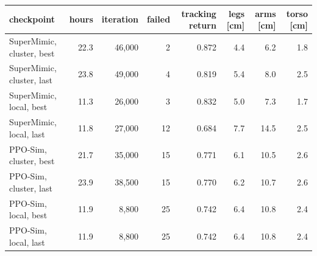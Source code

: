 \begin{tabular}{lrrrrrrr}\toprule
checkpoint & hours & iteration & failed & tracking return & legs [cm] & arms [cm] & torso [cm] \\\midrule
SuperMimic, cluster, best & 22.3 & 46,000 & 2 & 0.872 & 4.4 & 6.2 & 1.8 \\
SuperMimic, cluster, last & 23.8 & 49,000 & 4 & 0.819 & 5.4 & 8.0 & 2.5 \\
\midrule
SuperMimic, local, best & 11.3 & 26,000 & 3 & 0.832 & 5.0 & 7.3 & 1.7 \\
SuperMimic, local, last & 11.8 & 27,000 & 12 & 0.684 & 7.7 & 14.5 & 2.5 \\
\midrule
PPO-Sim, cluster, best & 21.7 & 35,000 & 15 & 0.771 & 6.1 & 10.5 & 2.6 \\
PPO-Sim, cluster, last & 23.9 & 38,500 & 15 & 0.770 & 6.2 & 10.7 & 2.6 \\
\midrule
PPO-Sim, local, best & 11.9 & 8,800 & 25 & 0.742 & 6.4 & 10.8 & 2.4 \\
PPO-Sim, local, last & 11.9 & 8,800 & 25 & 0.742 & 6.4 & 10.8 & 2.4 \\
\bottomrule\end{tabular}
